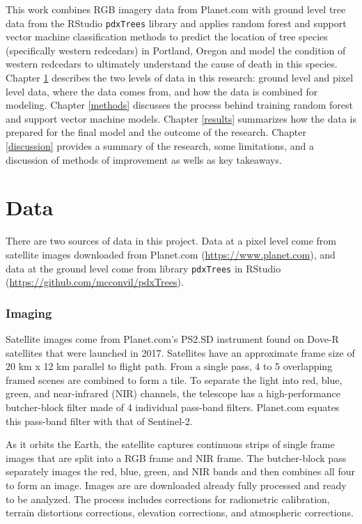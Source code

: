 \documentclass[12pt,twoside]{reedthesis}
\begin{document}
This work combines RGB imagery data from Planet.com with ground level tree data from the RStudio \texttt{pdxTrees} library and applies random forest and support vector machine classification methods to predict the location of tree species (specifically western redcedars) in Portland, Oregon and model the condition of western redcedars to ultimately understand the cause of death in this species. Chapter \ref{data} describes the two levels of data in this research: ground level and pixel level data, where the data comes from, and how the data is combined for modeling. Chapter \ref{methods} discusses the process behind training random forest and support vector machine models. Chapter \ref{results} summarizes how the data is prepared for the final model and the outcome of the research. Chapter \ref{discussion} provides a summary of the research, some limitations, and a discussion of methods of improvement as wells as key takeaways.

\hypertarget{data}{%
\chapter{Data}\label{data}}

There are two sources of data in this project. Data at a pixel level come from satellite images downloaded from Planet.com (\url{https://www.planet.com}), and data at the ground level come from library \texttt{pdxTrees} in RStudio (\url{https://github.com/mcconvil/pdxTrees}).

\hypertarget{imaging}{%
\subsection{Imaging}\label{imaging}}

Satellite images come from Planet.com's PS2.SD instrument found on Dove-R satellites that were launched in 2017. Satellites have an approximate frame size of 20 km x 12 km parallel to flight path. From a single pass, 4 to 5 overlapping framed scenes are combined to form a tile. To separate the light into red, blue, green, and near-infrared (NIR) channels, the telescope has a high-performance butcher-block filter made of 4 individual pass-band filters. Planet.com equates this pass-band filter with that of Sentinel-2.

As it orbits the Earth, the satellite captures continuous strips of single frame images that are split into a RGB frame and NIR frame. The butcher-block pass separately images the red, blue, green, and NIR bands and then combines all four to form an image. Images are are downloaded already fully processed and ready to be analyzed. The process includes corrections for radiometric calibration, terrain distortions corrections, elevation corrections, and atmospheric corrections.
\end{document}
